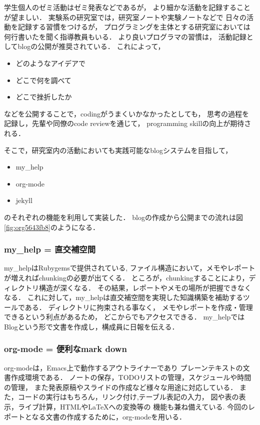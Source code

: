 \documentclass[a4,p11]{article}
\begin{document}
学生個人のゼミ活動はゼミ発表などであるが，
より細かな活動を記録することが望ましい．
実験系の研究室では，研究室ノートや実験ノートなどで
日々の活動を記録する習慣をつけるが，
プログラミングを主体とする研究室においては
何行書いたを聞く指導教員もいる．
より良いプログラマの習慣は，
活動記録としてblogの公開が推奨されている．
これによって，
\begin{itemize}
\item どのようなアイデアで
\item どこで何を調べて
\item どこで挫折したか
\end{itemize}
などを公開することで，codingがうまくいかなかったとしても，
思考の過程を記録し，先輩や同僚のcode reviewを通じて，
programming skillの向上が期待される．

そこで，研究室内の活動においても実践可能なblogシステムを目指して，
\begin{itemize}
\item my\_help
\item org-mode
\item jekyll
\end{itemize}
のそれぞれの機能を利用して実装した．
blogの作成から公開までの流れは図\ref{fig:org5643fb8}のようになる．

\subsubsection{my\_help = 直交補空間}
\label{sec:orgee96707}
my\_helpはRubygemsで提供されている,
ファイル構造において，メモやレポートが増えればchunkingの必要が出てくる．
ところが，chunkingすることにより，ディレクトリ構造が深くなる．
その結果，レポートやメモの場所が把握できなくなる．
これに対して，my\_helpは直交補空間を実現した知識構築を補助するツールである．
ディレクトリに拘束される事なく，
メモやレポートを作成・管理できるという利点があるため，
どこからでもアクセスできる．
my\_helpではBlogという形で文書を作成し，構成員に日報を伝える．

\subsubsection{org-mode = 便利なmark down}
\label{sec:orgeeca0bb}
org-modeは，Emacs上で動作するアウトライナーであり
プレーンテキストの文書作成環境である．
ノートの保存，TODOリストの管理，スケジュールや時間の管理，
また発表原稿やスライドの作成など様々な用途に対応している．
また，コードの実行はもちろん，リンク付け,テーブル表記の入力，
図や表の表示，ライブ計算，HTMLや\LaTeX{}への変換等の
機能も兼ね備えている.
今回のレポートとなる文書の作成するために，org-modeを用いる．
\end{document}
